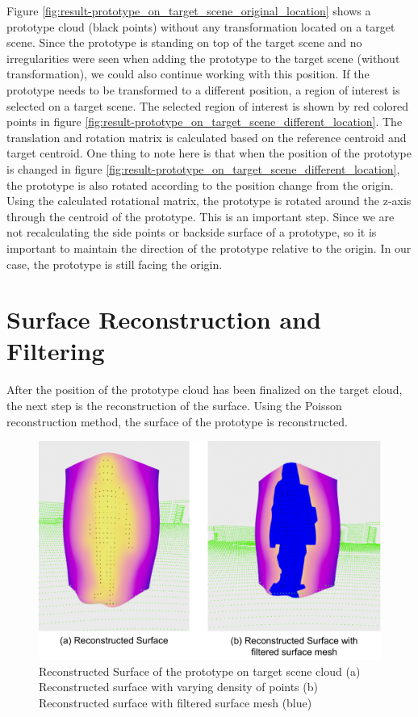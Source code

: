 Figure \ref{fig:result-prototype_on_target_scene_original_location} shows a prototype cloud (black points) without any transformation located on a target scene. Since the prototype is standing on top of the target scene and no irregularities were seen when adding the prototype to the target scene (without transformation), we could also continue working with this position. If the prototype needs to be transformed to a different position, a region of interest is selected on a target scene. The selected region of interest is shown by red colored points in figure \ref{fig:result-prototype_on_target_scene_different_location}. The translation and rotation matrix is calculated based on the reference centroid and target centroid. One thing to note here is that when the position of the prototype is changed in figure \ref{fig:result-prototype_on_target_scene_different_location}, the prototype is also rotated according to the position change from the origin. Using the calculated rotational matrix, the prototype is rotated around the z-axis through the centroid of the prototype. This is an important step. Since we are not recalculating the side points or backside surface of a prototype, so it is important to maintain the direction of the prototype relative to the origin. In our case, the prototype is still facing the origin.

\section{Surface Reconstruction and Filtering}
After the position of the prototype cloud has been finalized on the target cloud, the next step is the reconstruction of the surface. Using the Poisson reconstruction method, the surface of the prototype is reconstructed.

\begin{figure}[htbp]
    \centering
    \includegraphics[width=1\linewidth]{97_graphics/results/surface_reconstruction.pdf}
    \caption{Reconstructed Surface of the prototype on target scene cloud (a) Reconstructed surface with varying density of points (b) Reconstructed surface with filtered surface mesh (blue)}
    \label{fig:result-surface_reconstruction}
\end{figure}

